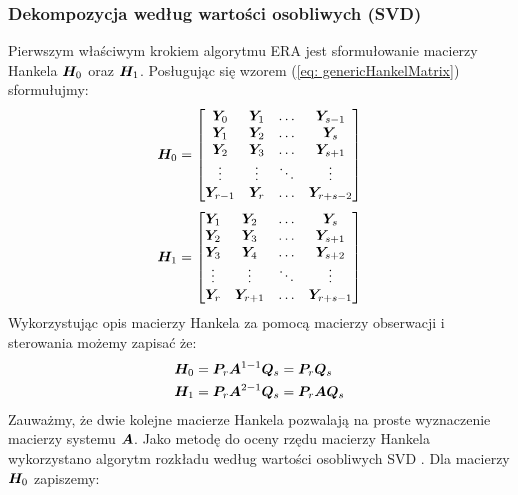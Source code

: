 \subsubsection{Dekompozycja według wartości osobliwych (SVD)}
Pierwszym właściwym krokiem algorytmu ERA jest sformułowanie macierzy Hankela $\bm{H}_0$ oraz $\bm{H}_1$. Posługując się wzorem (\ref{eq: genericHankelMatrix}) sformułujmy:
\begin{equation} \label{eq: HankelMatrixZero}
	\bm{H}_0 =\begin{bmatrix}
		\bm{Y}_0		&	\bm{Y}_{1} 	& \dots	& \bm{Y}_{s-1} \\
		\bm{Y}_1		&	\bm{Y}_{2}	& \dots	& \bm{Y}_{s} \\
		\bm{Y}_2		&	\bm{Y}_{3} 	& \dots	& \bm{Y}_{s+1} \\	
		\vdots			&	\vdots			& \ddots & \vdots\\
		\bm{Y}_{r-1}	&	\bm{Y}_{r} 	& \dots	& \bm{Y}_{r+s-2} 	
	\end{bmatrix} 
\end{equation}
\begin{equation} \label{eq: HankelMatrixShift}
	\bm{H}_1 =\begin{bmatrix}
		\bm{Y}_1		&	\bm{Y}_{2} 	& \dots	& \bm{Y}_{s} \\
		\bm{Y}_2		&	\bm{Y}_{3}	& \dots	& \bm{Y}_{s+1} \\
		\bm{Y}_3		&	\bm{Y}_{4} 	& \dots	& \bm{Y}_{s+2} \\	
		\vdots			&	\vdots			& \ddots & \vdots\\
		\bm{Y}_{r}	&	\bm{Y}_{r+1} 	& \dots	& \bm{Y}_{r+s-1} 	
	\end{bmatrix} 
\end{equation}
Wykorzystując opis macierzy Hankela za pomocą macierzy obserwacji i sterowania możemy zapisać że:
\begin{equation} \label{eq: HankelZeroOne}
	\begin{split}
		\bm{H}_0 &= \bm{P}_r \bm{A}^{1-1}\bm{Q}_s=\bm{P}_r\bm{Q}_s \\
		\bm{H}_1 &= \bm{P}_r \bm{A}^{2-1}\bm{Q}_s=\bm{P}_r\bm{A}\bm{Q}_s \\
	\end{split}
\end{equation}
Zauważmy, że dwie kolejne macierze Hankela pozwalają na proste wyznaczenie macierzy systemu $\bm{A}$. 
Jako metodę do oceny rzędu macierzy Hankela wykorzystano algorytm rozkładu według wartości osobliwych SVD . Dla macierzy $\bm{H}_0$ zapiszemy:
